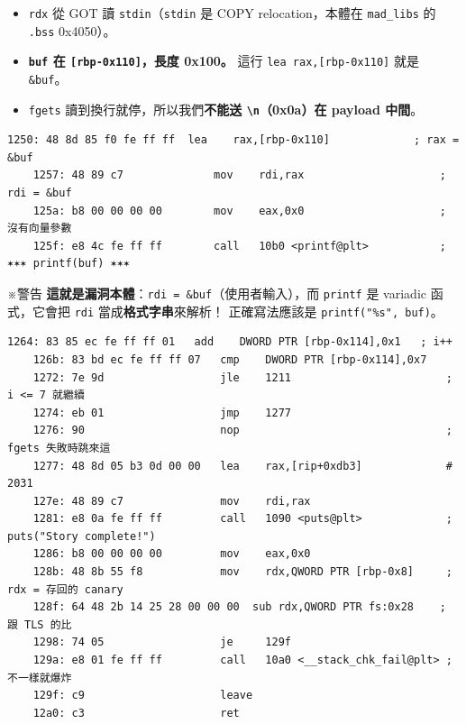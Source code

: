 \documentclass[10pt,a4paper]{article}
\providecommand{\tightlist}{%
  \setlength{\itemsep}{0pt}\setlength{\parskip}{0pt}}
\renewenvironment{quote}{%
  \begin{mdframed}[linewidth=0pt,innerleftmargin=0pt,innerrightmargin=0pt,
    innerbottommargin=0pt,innertopmargin=0pt,skipabove=0.55em,skipbelow=0.55em,
    leftmargin=0.9em,rightmargin=0.4em,startcode={\color{quotebar}\vrule width 2.6pt},%
    endcode={}]%
  \itshape\color{black}%
}{%
  \end{mdframed}%
}
\begin{document}
\begin{itemize}
\tightlist
\item
  \texttt{rdx} 從 GOT 讀 \texttt{stdin}（\texttt{stdin} 是 COPY
  relocation，本體在 \texttt{mad\_\allowbreak{}libs} 的 \texttt{.\allowbreak{}bss} 0x4050）。
\item
  \textbf{\texttt{buf} 在 \texttt{{[}rbp-\allowbreak{}0x110{]}}，長度 0x100。} 這行
  \texttt{lea\ \allowbreak{}rax,{[}rbp-\allowbreak{}0x110{]}} 就是 \texttt{\&\allowbreak{}buf}。
\item
  \texttt{fgets} 讀到換行就停，所以我們\textbf{不能送
  \texttt{\textbackslash{}\allowbreak{}n}（0x0a）在 payload 中間}。
\end{itemize}

\begin{Verbatim}[breaklines=true,breakanywhere=true,breakautoindent=false,fontsize=\fontsize{7.0}{9.5}\selectfont]
    1250: 48 8d 85 f0 fe ff ff  lea    rax,[rbp-0x110]             ; rax = &buf
    1257: 48 89 c7              mov    rdi,rax                     ; rdi = &buf
    125a: b8 00 00 00 00        mov    eax,0x0                     ; 沒有向量參數
    125f: e8 4c fe ff ff        call   10b0 <printf@plt>           ; ✶✶✶ printf(buf) ✶✶✶
\end{Verbatim}

\begin{quote}
※警告 \textbf{這就是漏洞本體}：\texttt{rdi\ \allowbreak{}=\ \allowbreak{}\&\allowbreak{}buf}（使用者輸入），而
\texttt{printf} 是 variadic 函式，它會把 \texttt{rdi}
當成\textbf{格式字串}來解析！ 正確寫法應該是
\texttt{printf("\%\allowbreak{}s",\allowbreak{}\ \allowbreak{}buf)}。
\end{quote}

\begin{Verbatim}[breaklines=true,breakanywhere=true,breakautoindent=false,fontsize=\fontsize{7.0}{9.5}\selectfont]
    1264: 83 85 ec fe ff ff 01   add    DWORD PTR [rbp-0x114],0x1   ; i++
    126b: 83 bd ec fe ff ff 07   cmp    DWORD PTR [rbp-0x114],0x7
    1272: 7e 9d                  jle    1211                        ; i <= 7 就繼續
    1274: eb 01                  jmp    1277
    1276: 90                     nop                                ; fgets 失敗時跳來這
    1277: 48 8d 05 b3 0d 00 00   lea    rax,[rip+0xdb3]             # 2031
    127e: 48 89 c7               mov    rdi,rax
    1281: e8 0a fe ff ff         call   1090 <puts@plt>             ; puts("Story complete!")
    1286: b8 00 00 00 00         mov    eax,0x0
    128b: 48 8b 55 f8            mov    rdx,QWORD PTR [rbp-0x8]     ; rdx = 存回的 canary
    128f: 64 48 2b 14 25 28 00 00 00  sub rdx,QWORD PTR fs:0x28    ; 跟 TLS 的比
    1298: 74 05                  je     129f
    129a: e8 01 fe ff ff         call   10a0 <__stack_chk_fail@plt> ; 不一樣就爆炸
    129f: c9                     leave
    12a0: c3                     ret
\end{Verbatim}
\end{document}

